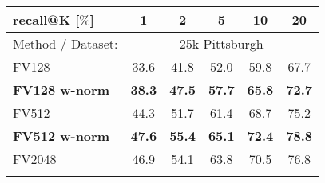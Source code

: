 
	\begin{tabularx}{0.883\linewidth}{|l|c c c c c|}
		\hline
		\rowcolor{maroon!10}
		recall@K [$\%$] & 1 & 2 & 5 & 10 & 20 \\
		\hline
		\hline 
		\rowcolor{maroon!40}
		Method / Dataset: & \multicolumn{5}{c|}{25k Pittsburgh} \\
		\hline 

		\rowcolor{maroon!10}
		FV128         & 33.6  & 41.8  & 52.0 & 59.8   & 67.7  \\
		\rowcolor{maroon!10}
		\textbf{FV128 w-norm}     & \textbf{38.3}   & \textbf{47.5} & \textbf{57.7} & \textbf{65.8} & \textbf{72.7}  \\
    \hline  
	    \rowcolor{maroon!10}
	    FV512         & 44.3 & 51.7   & 61.4  & 68.7   & 75.2  \\
	    \rowcolor{maroon!10}
	    \textbf{FV512 w-norm}   & \textbf{47.6}  & \textbf{55.4} & \textbf{65.1} & \textbf{72.4} & \textbf{78.8}  \\
	    \hline
		\rowcolor{maroon!10}
		FV2048        & 46.9  & 54.1  & 63.8  & 70.5    & 76.8 \\
		\rowcolor{maroon!10}
	    \rowcolor{maroon!10}

\end{tabularx}
